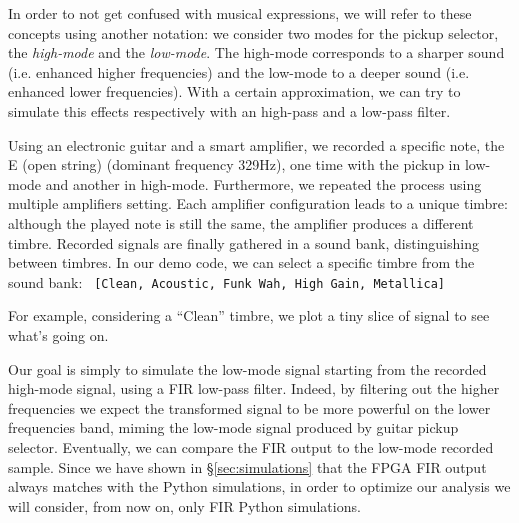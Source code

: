 In order to not get confused with musical expressions, we will refer to these concepts using another notation: we consider two modes for the pickup selector, the \emph{high-mode} and the \emph{low-mode}. The high-mode corresponds to a sharper sound (i.e. enhanced higher frequencies) and the low-mode to a deeper sound (i.e. enhanced lower frequencies). With a certain approximation, we can try to simulate this effects respectively with an high-pass and a low-pass filter.

Using an electronic guitar and a smart amplifier, we recorded a specific note, the E (open string) (dominant frequency 329Hz), one time with the pickup in low-mode and another in high-mode. Furthermore, we repeated the process using multiple amplifiers setting. Each amplifier configuration leads to a unique timbre: although the played note is still the same, the amplifier produces a different timbre. Recorded signals are finally gathered in a sound bank, distinguishing between timbres. In our demo code, we can select a specific timbre from the sound bank:
\texttt{ [Clean, Acoustic, Funk Wah, High Gain, Metallica] }


For example, considering a “Clean” timbre, we plot a tiny slice of signal to see what’s going on.
\begin{figure}[H]
    \caption{}
    \centering
    
    \qquad
\end{figure}

Our goal is simply to simulate the low-mode signal starting from the recorded high-mode signal, using a FIR low-pass filter. Indeed, by filtering out the higher frequencies we expect the transformed signal to be more powerful on the lower frequencies band, miming the low-mode signal produced by guitar pickup selector. Eventually, we can compare the FIR output to the low-mode recorded sample. Since we have shown in §\ref{sec:simulations} that the FPGA FIR output always matches with the Python simulations, in order to optimize our analysis we will consider, from now on, only FIR Python simulations.

